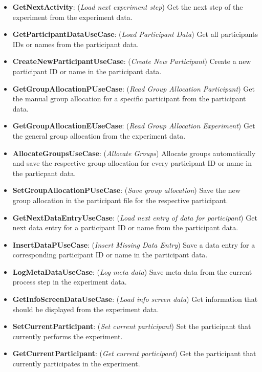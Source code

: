 \begin{itemize}
    \item \textbf{GetNextActivity}: (\textit{Load next experiment step}) Get the next step of the experiment from the experiment data.
    \item \textbf{GetParticipantDataUseCase}: (\textit{Load Participant Data}) Get all participants IDs or names from the participant data. 
    \item \textbf{CreateNewParticipantUseCase}: (\textit{Create New Participant}) Create a new participant ID or name in the participant data.
    \item \textbf{GetGroupAllocationPUseCase}: (\textit{Read Group Allocation Participant}) Get the manual group allocation for a specific participant from the participant data.
    \item \textbf{GetGroupAllocationEUseCase}: (\textit{Read Group Allocation Experiment}) Get the general group allocation from the experiment data.
    \item \textbf{AllocateGroupsUseCase}: (\textit{Allocate Groups}) Allocate groups automatically and save the respective group allocation for every participant ID or name in the particpant data. 
    \item \textbf{SetGroupAllocationPUseCase}: (\textit{Save group allocation}) Save the new group allocation in the participant file for the respective participant.
    \item \textbf{GetNextDataEntryUseCase}: (\textit{Load next entry of data for participant}) Get next data entry for a participant ID or name from the participant data. 
    \item \textbf{InsertDataPUseCase}: (\textit{Insert Missing Data Entry}) Save a data entry for a corresponding participant ID or name in the participant data.
    \item \textbf{LogMetaDataUseCase}: (\textit{Log meta data}) Save meta data from the current process step in the experiment data.
    \item \textbf{GetInfoScreenDataUseCase}: (\textit{Load info screen data}) Get information that should be displayed from the experiment data.  
    \item \textbf{SetCurrentParticipant}: (\textit{Set current participant}) Set the participant that currently performs the experiment.  
    \item \textbf{GetCurrentParticipant}: (\textit{Get current participant}) Get the participant that currently participates in the experiment.  
\end{itemize}

